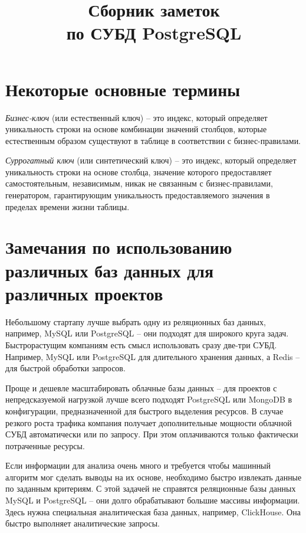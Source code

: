 \documentclass[%
	11pt,
	a4paper,
	utf8,
		]{article}
\begin{document}
\title{Сборник заметок\\по СУБД PostgreSQL}

\author{}

\date{}
\maketitle

\thispagestyle{fancy}

\tableofcontents

\section{Некоторые основные термины}

\noindent\emph{Бизнес-ключ} (или естественный ключ) -- это индекс, который определяет уникальность строки на основе комбинации значений столбцов, которые естественным образом существуют в таблице в соответствии с бизнес-правилами.

\noindent\emph{Суррогатный ключ} (или синтетический ключ) -- это индекс, который определяет уникальность строки на основе столбца, значение которого предоставляет самостоятельным, независимым, никак не связанным с бизнес-правилами, генератором, гарантирующим уникальность предоставляемого значения в пределах времени жизни таблицы.

\section{Замечания по использованию различных баз данных для различных проектов}

Небольшому стартапу лучше выбрать одну из реляционных баз данных, например, MySQL или PostgreSQL -- они подходят для широкого круга задач. Быстрорастущим компаниям есть смысл использовать сразу две-три СУБД. Например, MySQL или PostgreSQL для длительного хранения данных, а Redis -- для быстрой обработки запросов.

Проще и дешевле масштабировать облачные базы данных -- для проектов с непредсказуемой нагрузкой лучше всего подходят PostgreSQL или MongoDB в конфигурации, предназначенной для быстрого выделения ресурсов. В случае резкого роста трафика компания получает дополнительные мощности облачной СУБД автоматически или по запросу. При этом оплачиваются только фактически потраченные ресурсы.

Если информации для анализа очень много и требуется чтобы машинный алгоритм мог сделать выводы на их основе, необходимо быстро извлекать данные по заданным критериям. С этой задачей не справятся реляционные базы данных MySQL и PostgreSQL -- они долго обрабатывают большие массивы информации. Здесь нужна специальная аналитическая база данных, например, ClickHouse. Она быстро выполняет аналитические запросы.
\end{document}
